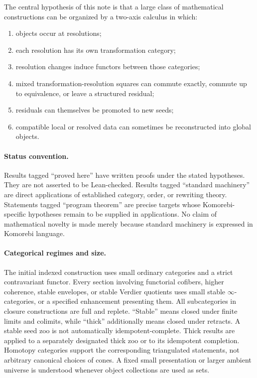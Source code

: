 \documentclass[11pt]{article}
\theoremstyle{definition}
\theoremstyle{remark}
\begin{document}
The central hypothesis of this note is that a large class of mathematical constructions can be organized by a two-axis calculus in which:
\begin{enumerate}
    \item objects occur at resolutions;
    \item each resolution has its own transformation category;
    \item resolution changes induce functors between those categories;
    \item mixed transformation-resolution squares can commute exactly, commute up to equivalence, or leave a structured residual;
    \item residuals can themselves be promoted to new seeds;
    \item compatible local or resolved data can sometimes be reconstructed into global objects.
\end{enumerate}

\paragraph{Status convention.}
Results tagged ``proved here'' have written proofs under the stated hypotheses. They are not asserted to be Lean-checked. Results tagged ``standard machinery'' are direct applications of established category, order, or rewriting theory. Statements tagged ``program theorem'' are precise targets whose Komorebi-specific hypotheses remain to be supplied in applications. No claim of mathematical novelty is made merely because standard machinery is expressed in Komorebi language.

\paragraph{Categorical regimes and size.}
The initial indexed construction uses small ordinary categories and a strict contravariant functor. Every section involving functorial cofibers, higher coherence, stable envelopes, or stable Verdier quotients uses small stable $\infty$-categories, or a specified enhancement presenting them. All subcategories in closure constructions are full and replete. ``Stable'' means closed under finite limits and colimits, while ``thick'' additionally means closed under retracts. A stable seed zoo is not automatically idempotent-complete. Thick results are applied to a separately designated thick zoo or to its idempotent completion. Homotopy categories support the corresponding triangulated statements, not arbitrary canonical choices of cones. A fixed small presentation or larger ambient universe is understood whenever object collections are used as sets.
\end{document}
